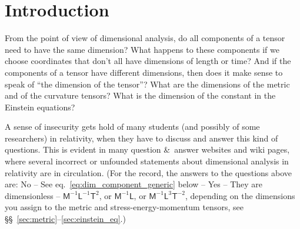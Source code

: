 \documentclass[\ifafour a4paper,12pt,\else a5paper,10pt,\fi%
onecolumn,oneside,article,%
british%
]{memoir}
\theoremstyle{remark}
\theoremstyle{innote}
\newcommand*{\amp}{\&}
\renewcommand*{\|}[1][]{\nonscript\,#1\vert\nonscript\;\mathopen{}}
\newcommand*{\sects}{\S\S}%
\newcommand*{\eqn}{eq.}%
\newcommand*{\Le}{\textsf{L}}
\newcommand*{\Ti}{\textsf{T}}
\newcommand*{\Ma}{\textsf{M}}
\begin{document}

\section{Introduction}
\label{sec:intro}


From the point of view of dimensional analysis, do all components of a
tensor need to have the same dimension? What happens to these components if
we choose coordinates that don't all have dimensions of length or time? And
if the components of a tensor have different dimensions, then does it make
sense to speak of \enquote{the dimension of the tensor}? What are the
dimensions of the metric and of the curvature tensors? What is the
dimension of the constant in the Einstein equations?

A sense of insecurity gets hold of many students (and possibly of some
researchers) in relativity, when they have to discuss and answer this kind
of questions. %
This is evident in many question \amp\ answer websites and wiki pages,
where several incorrect or unfounded statements about dimensional analysis
in relativity are in circulation. (For the record, the answers to the
questions above are: No -- See \eqn~\eqref{eq:dim_component_generic} below
-- Yes -- They are dimensionless -- $\Ma^{-1}\Le^{-1}\Ti^{2}$, or
$\Ma^{-1}\Le$, or $\Ma^{-1}\Le^{3}\Ti^{-2}$, depending on the dimensions
you assign to the metric and stress-energy-momentum tensors, see
\sects~\ref{sec:metric}--\ref{sec:einstein_eq}.)
\end{document}
